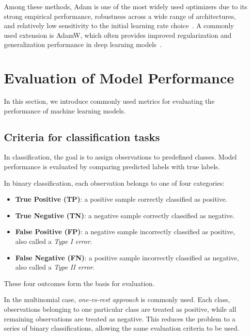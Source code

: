  Among these methods, Adam is one of the most widely used optimizers due to its strong empirical performance, robustness across a wide range of architectures, and relatively low sensitivity to the initial learning rate choice~\cite{kingma2015adam}. A commonly used extension is AdamW, which often provides improved regularization and generalization performance in deep learning models~\cite{loshchilov2019}.

\section{Evaluation of Model Performance}
\label{sec:evaluation-model-performance}

In this section, we introduce commonly used metrics for evaluating the performance of machine learning models.

\subsection{Criteria for classification tasks}
\label{sec:criteria-classification-tasks}

In classification, the goal is to assign observations to predefined classes. Model performance is evaluated by comparing predicted labels with true labels.


In binary classification, each observation belongs to one of four categories:

\begin{itemize}
    \item \textbf{True Positive (TP)}: a positive sample correctly classified as positive.
    \item \textbf{True Negative (TN)}: a negative sample correctly classified as negative.
    \item \textbf{False Positive (FP)}: a negative sample incorrectly classified as positive, also called a \textit{Type I error}.
    \item \textbf{False Negative (FN)}: a positive sample incorrectly classified as negative, also called a \textit{ Type II error}.
\end{itemize}

These four outcomes form the basis for evaluation.

In the multinomial case, \emph{one-vs-rest approach} is commonly used. Each class, observations belonging to one particular class are treated as positive, while all remaining observations are treated as negative. This reduces the problem to a series of binary classifications, allowing the same evaluation criteria to be used.

